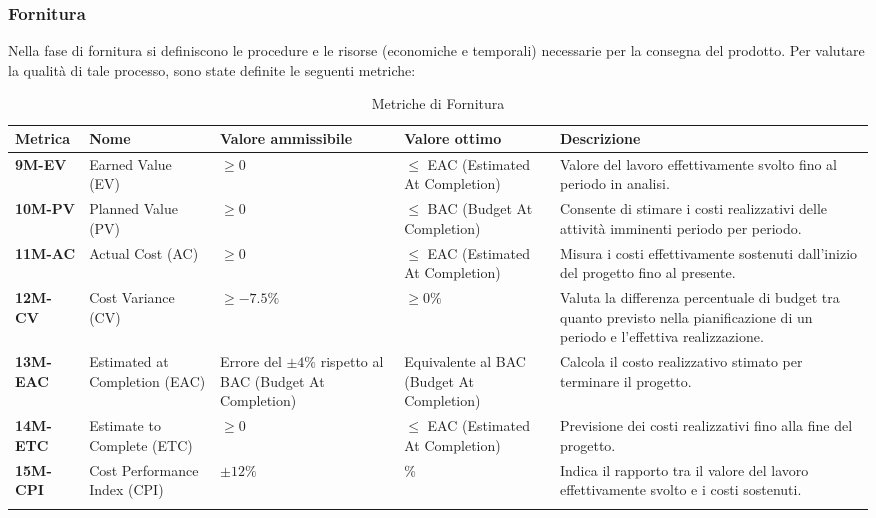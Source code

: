 \subsubsection{Fornitura}
Nella fase di fornitura si definiscono le procedure e le risorse (economiche e temporali) necessarie per la consegna del prodotto.
Per valutare la qualità di tale processo, sono state definite le seguenti metriche:
\begin{longtable}{|>{\raggedright\arraybackslash}m{}|>{\raggedright\arraybackslash}m{}|>{\raggedright\arraybackslash}m{}|>{\raggedright\arraybackslash}m{}|>{\raggedright\arraybackslash}m{}|}
	\hline
	\textbf{Metrica} & \textbf{Nome} & \textbf{Valore ammissibile} & \textbf{Valore ottimo} & \textbf{Descrizione}\\
	\hline
	\endhead
	\textbf{9M-EV} & Earned Value (EV) & $\geq 0$ & $\leq$ EAC (Estimated At Completion) & Valore del lavoro effettivamente svolto fino al periodo in analisi. \\
	\hline
	\textbf{10M-PV} & Planned Value (PV) & $\geq 0$ & $\leq$ BAC (Budget At Completion) & Consente di stimare i costi realizzativi delle attività imminenti periodo per periodo. \\
	\hline
	\textbf{11M-AC} & Actual Cost (AC) & $\geq 0$ & $\leq$ EAC (Estimated At Completion) & Misura i costi effettivamente sostenuti dall'inizio del progetto fino al presente. \\
	\hline
	\textbf{12M-CV} & Cost Variance (CV) & $\geq -7.5\%$ & $\geq 0\%$ & Valuta la differenza percentuale di budget tra quanto previsto nella pianificazione di un periodo e l'effettiva realizzazione. \\
	\hline
	\textbf{13M-EAC} & Estimated at Completion (EAC) & Errore del $\pm 4\%$ rispetto al BAC (Budget At Completion) & Equivalente al BAC (Budget At Completion) & Calcola il costo realizzativo stimato per terminare il progetto.\\
	\hline
	\textbf{14M-ETC} & Estimate to Complete (ETC) & $\geq 0$ & $\leq$ EAC (Estimated At Completion) & Previsione dei costi realizzativi fino alla fine del progetto.\\
	\hline
	\textbf{15M-CPI} & Cost Performance Index (CPI) & $\pm 12\%$ & 0\% & Indica il rapporto tra il valore del lavoro effettivamente svolto e i costi sostenuti.\\
	\hline
	\caption{Metriche di Fornitura}
	\label{table:4}
\end{longtable}

